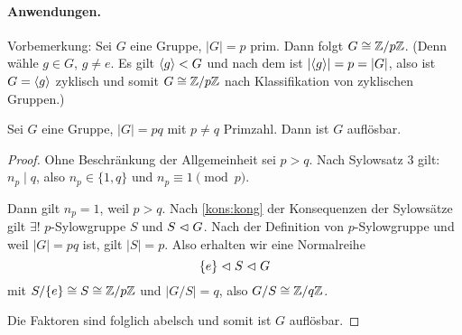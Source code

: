 \documentclass[12pt,a4paper]{scrartcl}
\begin{document}
\paragraph{Anwendungen.}
Vorbemerkung: Sei $G$ eine Gruppe, $|G| = p$ prim. Dann folgt $G\cong \mathbb Z/p\mathbb Z$. (Denn wähle $g\in G$, $g\neq e$. Es gilt $\langle g\rangle <G$ und nach dem  ist $|\langle g\rangle| = p = |G|$, also ist $G = \langle g\rangle$ zyklisch und somit $G\cong \mathbb Z/p\mathbb Z$ nach Klassifikation von zyklischen Gruppen.)
\begin{satz}
	Sei $G$ eine Gruppe, $|G| = pq$ mit $p\neq q$ Primzahl. Dann ist $G$ auflösbar.
\end{satz}	
\begin{proof}
	Ohne Beschränkung der Allgemeinheit sei $p>q$. Nach Sylowsatz 3 gilt: $n_p\mid q$, also $n_p\in\{1,q\}$ und $n_p\equiv 1 \pmod p$.
	
	Dann gilt $n_p = 1$, weil $p>q$. Nach \cref{kons:kong} der Konsequenzen der Sylowsätze gilt $\exists!$ $p$-Sylowgruppe $S$ und $S\vartriangleleft G$. Nach der Definition von $p$-Sylowgruppe und weil $|G| = pq$ ist, gilt $|S| = p$. Also erhalten wir eine Normalreihe 
	$$ \{e\}\vartriangleleft S\vartriangleleft G$$ mit $S/\{e\}\cong S\cong \mathbb Z/p\mathbb Z$ und $|G/S| = q$, also $G/S\cong \mathbb Z/q\mathbb Z$.
	
	Die Faktoren sind folglich abelsch und somit ist $G$ auflösbar.
\end{proof}
\end{document}
